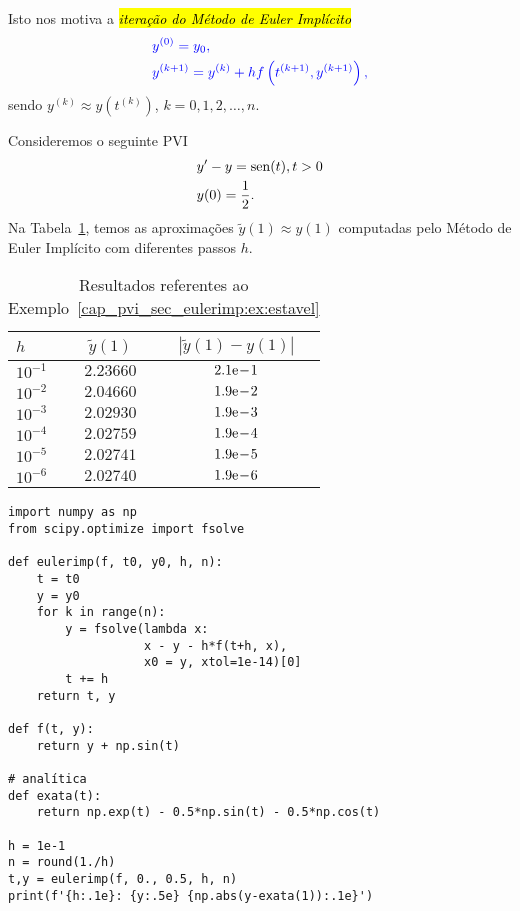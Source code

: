 Isto nos motiva a \hl{\emph{iteração do Método de Euler Implícito}}{\euler}
\begin{equation}\color{blue}\begin{aligned}
    &y^{(0)} = y_0,\\
    &y^{(k+1)} = y^{(k)} + hf\left(t^{(k+1)}, y^{(k+1)}\right),
  \end{aligned}
\end{equation}
sendo $y^{(k)} \approx y\left(t^{(k)}\right)$, $k = 0, 1, 2, \dotsc, n$.

\begin{ex}\label{cap_pvi_sec_eulerimp:ex:estavel}
  Consideremos o seguinte PVI
  \begin{subequations}
    \begin{align}
      &y' - y = \operatorname{sen}(t), t>0\\
      &y(0) = \frac{1}{2}.
    \end{align}
  \end{subequations}
  Na Tabela~\ref{cap_pvi_sec_eulerimp:tab:ex_estavel}, temos as aproximações $\tilde{y}(1) \approx y(1)$ computadas pelo Método de Euler Implícito com diferentes passos $h$.
 
  \begin{table}[H]
    \centering
    \begin{tabular}{l|cc}
      $h$ & $\tilde{y}(1)$ & $|\tilde{y}(1)-y(1)|$\\\hline
      $10^{-1}$ & $2.23660$ & $2.1\mathrm{e}\!-\!1$ \\
      $10^{-2}$ & $2.04660$ & $1.9\mathrm{e}\!-\!2$ \\
      $10^{-3}$ & $2.02930$ & $1.9\mathrm{e}\!-\!3$ \\
      $10^{-4}$ & $2.02759$ & $1.9\mathrm{e}\!-\!4$ \\
      $10^{-5}$ & $2.02741$ & $1.9\mathrm{e}\!-\!5$ \\
      $10^{-6}$ & $2.02740$ & $1.9\mathrm{e}\!-\!6$ \\\hline
    \end{tabular}
    \caption{Resultados referentes ao Exemplo~\ref{cap_pvi_sec_eulerimp:ex:estavel}}
    \label{cap_pvi_sec_eulerimp:tab:ex_estavel}
  \end{table}

\begin{lstlisting}[caption = eulerImp.py]
import numpy as np
from scipy.optimize import fsolve

def eulerimp(f, t0, y0, h, n):
    t = t0
    y = y0
    for k in range(n):
        y = fsolve(lambda x:
                   x - y - h*f(t+h, x),
                   x0 = y, xtol=1e-14)[0]
        t += h
    return t, y

def f(t, y):
    return y + np.sin(t)

# analítica
def exata(t):
    return np.exp(t) - 0.5*np.sin(t) - 0.5*np.cos(t)

h = 1e-1
n = round(1./h)
t,y = eulerimp(f, 0., 0.5, h, n)
print(f'{h:.1e}: {y:.5e} {np.abs(y-exata(1)):.1e}')
\end{lstlisting}
\end{ex}

